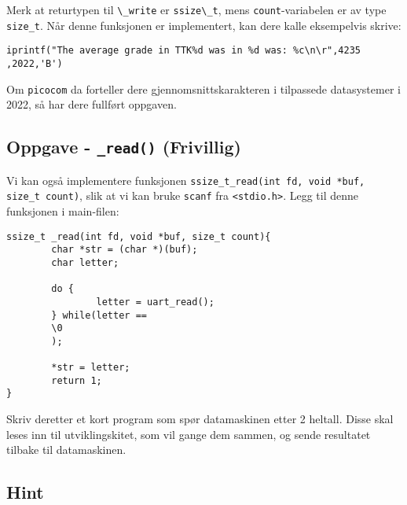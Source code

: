 Merk at returtypen til \lstinline{\_write} er \lstinline{ssize\_t}, mens \verb|count|-variabelen er av type \verb|size_t|. Når denne funksjonen er implementert, kan dere kalle eksempelvis skrive:




\verb|iprintf("The average grade in TTK%d was in %d was: %c\n\r",4235|\newline
\verb|,2022,'B')|

Om \verb|picocom| da forteller dere gjennomsnittskarakteren i tilpassede datasystemer i 2022, så har dere fullført oppgaven.




\cprotect\subsection{Oppgave - \lstinline{_read()} (Frivillig)}

Vi kan også implementere funksjonen \lstinline{ssize_t_read(int fd, void *buf, size_t count)}, slik at vi kan bruke \verb|scanf| fra \verb|<stdio.h>|. Legg til denne funksjonen i main-filen:


\begin{lstlisting}
ssize_t _read(int fd, void *buf, size_t count){
        char *str = (char *)(buf);
        char letter;
        
        do {
                letter = uart_read();
        } while(letter == 
        \0
        );
        
        *str = letter;
        return 1;
}
\end{lstlisting}

Skriv deretter et kort program som spør datamaskinen etter 2 heltall. Disse
skal leses inn til utviklingskitet, som vil gange dem sammen, og sende resultatet
tilbake til datamaskinen.

\subsection{Hint}\label{subsec:UART-hint}

